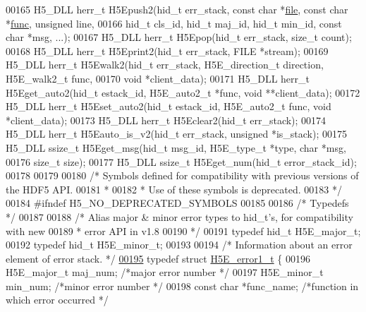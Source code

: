 \begin{DoxyCode}
00165 H5\_DLL herr\_t H5Epush2(hid\_t err\_stack, \textcolor{keyword}{const} \textcolor{keywordtype}{char} *\hyperlink{structfile}{file}, \textcolor{keyword}{const} \textcolor{keywordtype}{char} *\hyperlink{structfunc}{func}, \textcolor{keywordtype}{unsigned} line,
00166     hid\_t cls\_id, hid\_t maj\_id, hid\_t min\_id, \textcolor{keyword}{const} \textcolor{keywordtype}{char} *msg, ...);
00167 H5\_DLL herr\_t H5Epop(hid\_t err\_stack, \textcolor{keywordtype}{size\_t} count);
00168 H5\_DLL herr\_t H5Eprint2(hid\_t err\_stack, FILE *stream);
00169 H5\_DLL herr\_t H5Ewalk2(hid\_t err\_stack, H5E\_direction\_t direction, H5E\_walk2\_t func,
00170     \textcolor{keywordtype}{void} *client\_data);
00171 H5\_DLL herr\_t H5Eget\_auto2(hid\_t estack\_id, H5E\_auto2\_t *func, \textcolor{keywordtype}{void} **client\_data);
00172 H5\_DLL herr\_t H5Eset\_auto2(hid\_t estack\_id, H5E\_auto2\_t func, \textcolor{keywordtype}{void} *client\_data);
00173 H5\_DLL herr\_t H5Eclear2(hid\_t err\_stack);
00174 H5\_DLL herr\_t H5Eauto\_is\_v2(hid\_t err\_stack, \textcolor{keywordtype}{unsigned} *is\_stack);
00175 H5\_DLL ssize\_t H5Eget\_msg(hid\_t msg\_id, H5E\_type\_t *type, \textcolor{keywordtype}{char} *msg,
00176     \textcolor{keywordtype}{size\_t} size);
00177 H5\_DLL ssize\_t H5Eget\_num(hid\_t error\_stack\_id);
00178 
00179 
00180 \textcolor{comment}{/* Symbols defined for compatibility with previous versions of the HDF5 API.}
00181 \textcolor{comment}{ *}
00182 \textcolor{comment}{ * Use of these symbols is deprecated.}
00183 \textcolor{comment}{ */}
00184 \textcolor{preprocessor}{#ifndef H5\_NO\_DEPRECATED\_SYMBOLS}
00185 
00186 \textcolor{comment}{/* Typedefs */}
00187 
00188 \textcolor{comment}{/* Alias major & minor error types to hid\_t's, for compatibility with new}
00189 \textcolor{comment}{ *      error API in v1.8}
00190 \textcolor{comment}{ */}
00191 \textcolor{keyword}{typedef} hid\_t   H5E\_major\_t;
00192 \textcolor{keyword}{typedef} hid\_t   H5E\_minor\_t;
00193 
00194 \textcolor{comment}{/* Information about an error element of error stack. */}
\hyperlink{struct_h5_e__error1__t}{00195} \textcolor{keyword}{typedef} \textcolor{keyword}{struct }\hyperlink{struct_h5_e__error1__t}{H5E\_error1\_t} \{
00196     H5E\_major\_t maj\_num;                \textcolor{comment}{/*major error number                 */}
00197     H5E\_minor\_t min\_num;                \textcolor{comment}{/*minor error number                 */}
00198     \textcolor{keyword}{const} \textcolor{keywordtype}{char}  *func\_name;             \textcolor{comment}{/*function in which error occurred   */}

\end{DoxyCode}
